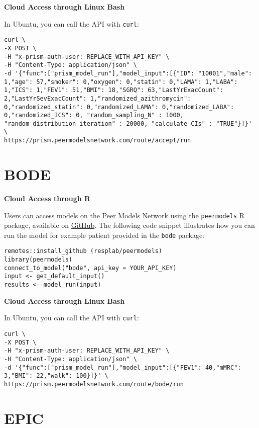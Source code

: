 \documentclass[
]{book}
\begin{document}
\textbf{Cloud Access through Linux Bash}

In Ubuntu, you can call the API with \texttt{curl}:

\begin{verbatim}
curl \
-X POST \
-H "x-prism-auth-user: REPLACE_WITH_API_KEY" \
-H "Content-Type: application/json" \
-d '{"func":["prism_model_run"],"model_input":[{"ID": "10001","male": 1,"age": 57,"smoker": 0,"oxygen": 0,"statin": 0,"LAMA": 1,"LABA": 1,"ICS": 1,"FEV1": 51,"BMI": 18,"SGRQ": 63,"LastYrExacCount": 2,"LastYrSevExacCount": 1,"randomized_azithromycin": 0,"randomized_statin": 0,"randomized_LAMA": 0,"randomized_LABA": 0,"randomized_ICS": 0, "random_sampling_N" : 1000, "random_distribution_iteration" : 20000, "calculate_CIs" : "TRUE"}]}' \
https://prism.peermodelsnetwork.com/route/accept/run
\end{verbatim}

\hypertarget{bode}{%
\section{BODE}\label{bode}}

\textbf{Cloud Access through R}

Users can access models on the Peer Models Network using the \texttt{peermodels} R package, available on \href{https://github.com/resplab/peermodels}{GitHub}. The following code snippet illustrates how you can run the model for example patient provided in the \texttt{bode} package:

\begin{verbatim}
remotes::install_github (resplab/peermodels)
library(peermodels)
connect_to_model("bode", api_key = YOUR_API_KEY)
input <- get_default_input()
results <- model_run(input)
\end{verbatim}

\textbf{Cloud Access through Linux Bash}

In Ubuntu, you can call the API with \texttt{curl}:

\begin{verbatim}
curl \
-X POST \
-H "x-prism-auth-user: REPLACE_WITH_API_KEY" \
-H "Content-Type: application/json" \
-d '{"func":["prism_model_run"],"model_input":[{"FEV1": 40,"mMRC": 3,"BMI": 22,"walk": 100}]}' \
https://prism.peermodelsnetwork.com/route/bode/run
\end{verbatim}

\hypertarget{epic}{%
\section{EPIC}\label{epic}}
\end{document}
